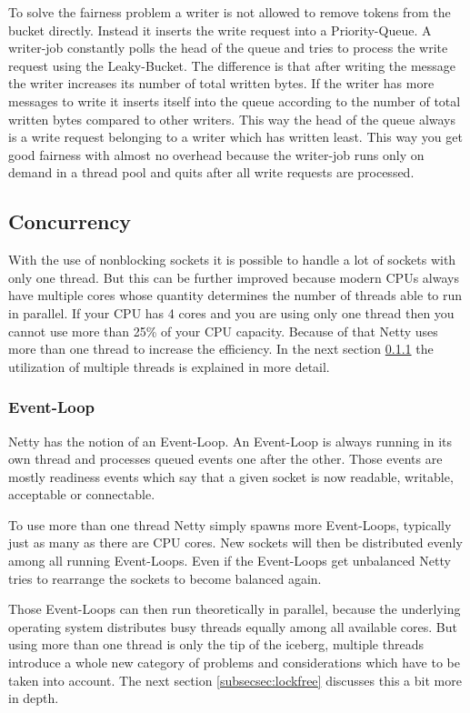 To solve the fairness problem a writer is not allowed to remove tokens from the bucket directly. Instead it inserts the write request into a Priority-Queue. A writer-job constantly polls the head of the queue and tries to process the write request using the Leaky-Bucket. The difference is that after writing the message the writer increases its number of total written bytes. If the writer has more messages to write it inserts itself into the queue according to the number of total written bytes compared to other writers. This way the head of the queue always is a write request belonging to a writer which has written least. This way you get good fairness with almost no overhead because the writer-job runs only on demand in a thread pool and quits after all write requests are processed.

\cleardoublepage
\subsection{Concurrency}
With the use of nonblocking sockets it is possible to handle a lot of sockets with only one thread. But this can be further improved because modern CPUs always have multiple cores whose quantity determines the number of threads able to run in parallel. If your CPU has 4 cores and you are using only one thread then you cannot use more than 25\% of your CPU capacity. Because of that Netty uses more than one thread to increase the efficiency. In the next section \ref{subsecsec:eventloop} the utilization of multiple threads is explained in more detail.

\subsubsection{Event-Loop}
\label{subsecsec:eventloop}
Netty has the notion of an Event-Loop. An Event-Loop is always running in its own thread and processes queued events one after the other. Those events are mostly readiness events which say that a given socket is now readable, writable, acceptable or connectable.

To use more than one thread Netty simply spawns more Event-Loops, typically just as many as there are CPU cores. New sockets will then be distributed evenly among all running Event-Loops. Even if the Event-Loops get unbalanced Netty tries to rearrange the sockets to become balanced again.

Those Event-Loops can then run theoretically in parallel, because the underlying operating system distributes busy threads equally among all available cores. But using more than one thread is only the tip of the iceberg, multiple threads introduce a whole new category of problems and considerations which have to be taken into account. The next section \ref{subsecsec:lockfree} discusses this a bit more in depth.


